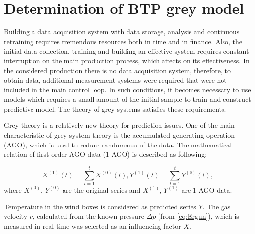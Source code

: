 \documentclass[AMS,STIX2COL]{WileyNJD-v2}
\begin{document}
\section{Determination of BTP grey model} \label{GreyModel}
Building a data  acquisition system with data storage, analysis and continuous retraining requires tremendous resources both in time and in finance. Also, the initial data collection, training and building an effective system requires constant interruption on the main production process, which affects on its effectiveness. In the considered production there is no data acquisition system, therefore, to obtain data, additional measurement systems were required that were not included in the main control loop. In such conditions, it becomes necessary to use models which requires a small amount of the initial sample to train and construct predictive model. The theory of grey systems satisfies these requirements.

Grey theory is a relatively new theory for prediction issues. One of the main characteristic of grey system theory is the accumulated generating operation (AGO), which is used to reduce randomness of the data. The mathematical relation of first-order AGO data (1-AGO) is described as following:

\begin{equation}
X^{(1)}(t)=\sum_{l=1}^{t}X^{(0)}(l),
Y^{(1)}(t)=\sum_{l=1}^{t}Y^{(0)}(l),
\end{equation}
where $X^{(0)}$, $Y^{(0)}$ are the original series and  $X^{(1)}$,  $Y^{(1)}$  are 1-AGO data.

Temperature in the wind boxes is considered as predicted series $Y$. The gas velocity $\nu$, calculated from the known pressure $\Delta p$ (from \eqref{eq:Ergun}), which is measured in real time was selected as an influencing factor $X$.
\end{document}
